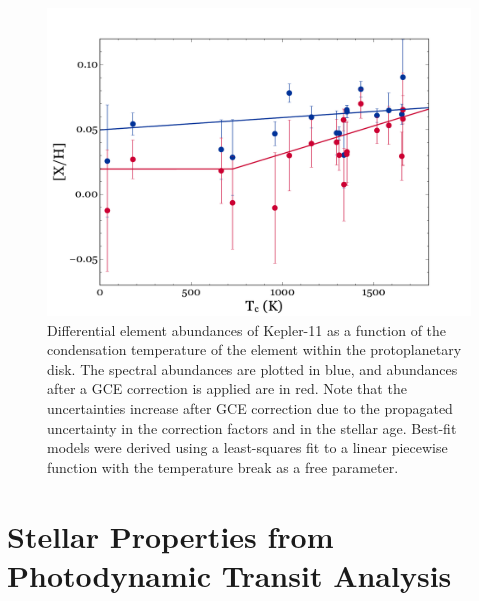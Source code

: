 \documentclass[oneside]{emulateapj}
\begin{document}
\begin{figure}
\centering
\includegraphics[scale=0.45]{K11_Tc_break}
\caption{Differential element abundances of Kepler-11 as a function of the condensation temperature of the element within the protoplanetary disk. The spectral abundances are plotted in blue, and abundances after a GCE correction is applied are in red. Note that the uncertainties increase after GCE correction due to the propagated uncertainty in the correction factors and in the stellar age. Best-fit models were derived using a least-squares fit to a linear piecewise function with the temperature break as a free parameter. }
\label{fig:tc}
\end{figure}




\section{Stellar Properties from Photodynamic Transit Analysis}
\label{s:ttvs}
\end{document}

